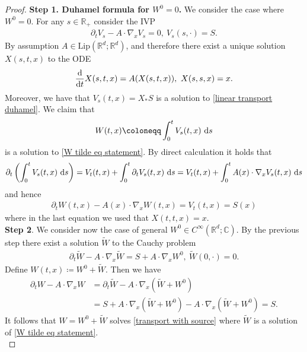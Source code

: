\documentclass[11pt,reqno]{amsart}
\numberwithin{equation}{section}
\def\dd{{\rm d}}
\begin{document}
\begin{proof}
\textbf{Step 1. Duhamel formula for $W^{0}=0$.} We consider the case where $W^{0}=0$. For any $s\in \mathbb{R}_{+}$ consider the IVP 
\begin{align}
\partial_{t}V_{s}-A\cdot \nabla_{x}V_{s}=0, \ V_{s}(s,\cdot)=S. \label{linear transport duhamel}    
\end{align}
By assumption $A\in \mathrm{Lip}(\mathbb{R}^{d};\mathbb{R}^{d})$, and therefore there exist a unique  solution $X(s,t,x)$ to the  ODE 
\begin{align}
\frac{\dd}{\dd t}X(s,t,x)=A(X(s,t,x)),\ X(s,s,x)=x.\label{Flow ODE}
\end{align} 
Moreover, we have that  $V_{s}(t,x)=X_{\ast}S$ is a solution to \eqref{linear transport duhamel}. We claim that 
\begin{align*}
W(t,x)\coloneqq \int_{0}^{t}V_{s}(t,x) \ \dd s     
\end{align*} 
is a solution to \eqref{W tilde eq statement}. By direct calculation it holds that   
\begin{align*}
\partial_{t}\left(\int_{0}^{t}V_{s}(t,x)\ \dd s\right)=V_{t}(t,x)+\int_{0}^{t}\partial_{t}V_{s}(t,x)\ \dd s= V_{t}(t,x)+\int_{0}^{t} A(x)\cdot \nabla_{x}V_{s}(t,x)\ \dd s 
\end{align*}   
and hence 
\begin{align*}
 \partial_{t}W(t,x)-A(x)\cdot \nabla_{x}W(t,x)=V_{t}(t,x)=S(x)   
\end{align*}
where in the last equation we used that  $X(t,t,x)=x$. \\
\textbf{Step 2}. We consider now the case of general $W^{0}\in C^{\infty}(\mathbb{R}^{d};\mathbb{C})$. By the previous step there exist a  solution $\widetilde{W}$  to the Cauchy problem 
\begin{align}
\partial_{t}\widetilde{W}-A\cdot \nabla_{x}\widetilde{W}=S+A\cdot \nabla_{x}W^{0}, \ \widetilde{W}(0,\cdot)=0. \label{W tilde eq}  
\end{align}
Define $W(t,x)\coloneqq W^{0}+\widetilde{W}$.  Then we have 
\begin{align*}
\partial_{t}W-A\cdot \nabla_{x}W&=\partial_{t}\widetilde{W}-A\cdot \nabla_{x}(\widetilde{W}+W^{0})\\
&=S+A\cdot \nabla_{x}(\widetilde{W}+W^{0})-A\cdot \nabla_{x}(\widetilde{W}+W^{0})=S.     
\end{align*}
It follows that $W=W^{0}+\widetilde{W}$ solves \eqref{transport with source} where $\widetilde{W}$ is a solution of \eqref{W tilde eq statement}.\\ 

\end{proof}
\end{document}
